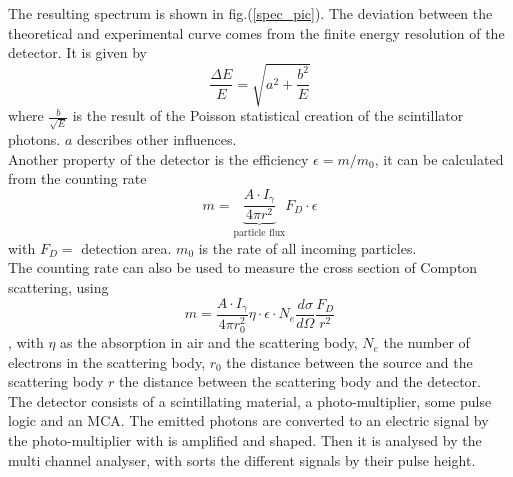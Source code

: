\documentclass{article}
\begin{document}
The resulting spectrum is shown in fig.(\ref{spec_pic}).
The deviation between the theoretical and experimental curve comes from the finite energy resolution of the detector. 
It is given by 
\begin{equation*}
    \frac{\Delta E}{E} = \sqrt{a^2 + \frac{b^2}{E}}
\end{equation*}
where $\frac{b}{\sqrt{E}}$ is the result of the Poisson statistical creation of the scintillator photons. $a$ describes other influences.\\
Another property of the detector is the efficiency $\epsilon = m/m_0$, it can be calculated from the counting rate
\begin{equation}
    m = \underbrace{\frac{A\cdot I_\gamma}{4\pi r^2}}_{\mbox{particle flux}}F_D\cdot\epsilon
    \label{eff}
\end{equation}
with $F_D =$ detection area. $m_0$ is the rate of all incoming particles.\\
The counting rate can also be used to measure the cross section of Compton scattering, using
\begin{equation}
    m = \frac{A\cdot I_\gamma}{4\pi r_0^2}\eta\cdot\epsilon\cdot N_e\frac{d\sigma}{d\Omega}\frac{F_D}{r^2}
    \label{diff_cross}
\end{equation}
, with $\eta$ as the absorption in air and the scattering body, $N_e$ the number of electrons in the scattering body, $r_0$ the distance between the source and the scattering body $r$ the distance between the scattering body and the detector.\\
The detector consists of a scintillating material, a photo-multiplier, some pulse logic and an MCA. 
The emitted photons are converted to an electric signal by the photo-multiplier with is amplified and shaped. Then it is analysed by the multi channel analyser, with sorts the different signals by their pulse height.

\newpage
\end{document}

